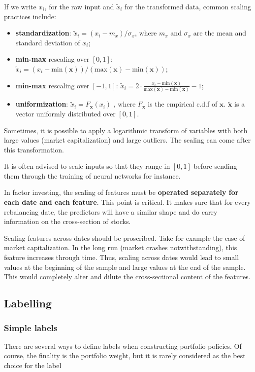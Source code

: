 If we write $x_{i}$, for the raw input and $\tilde{x}_i$ for the transformed data, common scaling practices include:
\begin{itemize}
    \item \textbf{standardization}: $\tilde{x}_{i} = (x_{i} - m_{x}) / \sigma _{x}$, where $m_{x}$ and $\sigma _{x}$ are the mean and standard deviation of $x_{i}$;
    \item \textbf{min-max} rescaling over $[0,1]$: $\tilde{x}_{i} = (x_{i} - \mathrm{min}(\mathbf{x})) / (\mathrm{max}(\mathbf{x}) - \mathrm{min}(\mathbf{x}))$; 
    \item \textbf{min-max} rescaling over $[-1,1]$: $\tilde{x}_i = 2 \cdot \frac{x_{i} - \mathrm{min}(\mathbf{x})}{\mathrm{max}(\mathbf{x}) - \mathrm{min}(\mathbf{x})} - 1$;
    \item \textbf{uniformization}: $\tilde{x}_i = F_{\mathbf{x}}(x_{i})$ , where $F_{\mathbf{x}}$ is the empirical c.d.f of $\mathbf{x}$. $\tilde{\mathbf{x}}$ is a vector uniformly distributed over $[0,1]$.
\end{itemize}

Sometimes, it is possible to apply a logarithmic transform of variables with both large values (market capitalization) and large outliers. The scaling can come after this transformation.

It is often advised to scale inputs so that they range in $[0,1]$ before sending them through the training of neural networks for instance.

In factor investing, the scaling of features must be \textbf{operated separately for each date and each feature}. This point is critical. It makes sure that for every rebalancing date, the predictors will have a similar shape and do carry information on the cross-section of stocks.

Scaling features across dates should be proscribed. Take for example the case of market capitalization. In the long run (market crashes notwithstanding), this feature increases through time. Thus, scaling across dates would lead to small values at the beginning of the sample and large values at the end of the sample. This would completely alter and dilute the cross-sectional content of the features.

\subsection{Labelling}

\subsubsection{Simple labels}
There are several ways to define labels when constructing portfolio policies. Of course, the finality is the portfolio weight, but it is rarely considered as the best choice for the label

